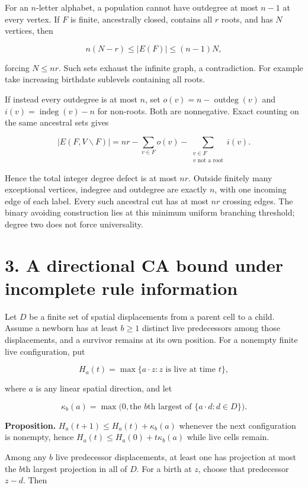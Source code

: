 \documentclass[
  11pt,
]{article}
\begin{document}
For an \(n\)-letter alphabet, a population cannot have outdegree at most
\(n-1\) at every vertex. If \(F\) is finite, ancestrally closed,
contains all \(r\) roots, and has \(N\) vertices, then

\[n(N-r)\le |E(F)|\le(n-1)N,\]

forcing \(N\le nr\). Such sets exhaust the infinite graph, a
contradiction. For example take increasing birthdate sublevels
containing all roots.

If instead every outdegree is at most \(n\), set
\(o(v)=n-\operatorname{outdeg}(v)\) and
\(i(v)=\operatorname{indeg}(v)-n\) for non-roots. Both are nonnegative.
Exact counting on the same ancestral sets gives

\[|E(F,V\backslash F)|=nr-\sum_{v\in F}o(v)
 -\sum_{\substack{v\in F\\v\text{ not a root}}}i(v).\]

Hence the total integer degree defect is at most \(nr\). Outside
finitely many exceptional vertices, indegree and outdegree are exactly
\(n\), with one incoming edge of each label. Every such ancestral cut
has at most \(nr\) crossing edges. The binary avoiding construction lies
at this minimum uniform branching threshold; degree two does not force
universality.

\section{3. A directional CA bound under incomplete rule
information}\label{a-directional-ca-bound-under-incomplete-rule-information}

Let \(D\) be a finite set of spatial displacements from a parent cell to
a child. Assume a newborn has at least \(b\ge1\) distinct live
predecessors among those displacements, and a survivor remains at its
own position. For a nonempty finite live configuration, put

\[H_a(t)=\max\{a\cdot z:z\text{ is live at time }t\},\]

where \(a\) is any linear spatial direction, and let

\[\kappa_b(a)=\max\bigl(0,\text{the }b\text{th largest of }
                           \{a\cdot d:d\in D\}\bigr).\]

\textbf{Proposition.} \(H_a(t+1)\le H_a(t)+\kappa_b(a)\) whenever the
next configuration is nonempty, hence \(H_a(t)\le H_a(0)+t\kappa_b(a)\)
while live cells remain.

Among any \(b\) live predecessor displacements, at least one has
projection at most the \(b\)th largest projection in all of \(D\). For a
birth at \(z\), choose that predecessor \(z-d\). Then
\end{document}
